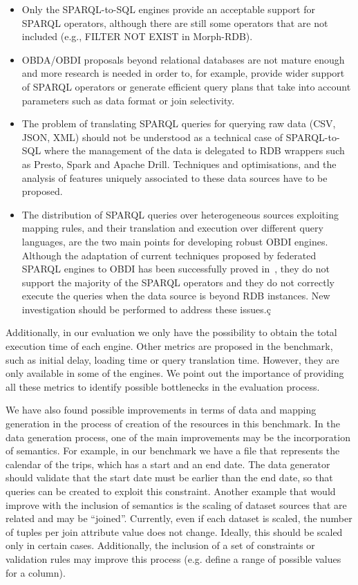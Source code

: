 \begin{itemize}
    \item Only the SPARQL-to-SQL engines provide an acceptable support for SPARQL operators, although there are still some operators that are not included (e.g., FILTER NOT EXIST in Morph-RDB).
    \item OBDA/OBDI proposals beyond relational databases are not mature enough and more research is needed in order to, for example, provide wider support of SPARQL operators or generate efficient query plans that take into account parameters such as data format or join selectivity.
    \item The problem of translating SPARQL queries for querying raw data (CSV, JSON, XML) should not be understood as a technical case of SPARQL-to-SQL where the management of the data is delegated to RDB wrappers such as Presto, Spark and Apache Drill. Techniques and optimisations, and the analysis of features uniquely associated to these data sources have to be proposed.
    \item The distribution of SPARQL queries over heterogeneous sources exploiting mapping rules, and their translation and execution over different query languages, are the two main points for developing robust OBDI engines. Although the adaptation of current techniques proposed by federated SPARQL engines to OBDI has been successfully proved in~\citep{endris2019ontario,mami2019querying}, they do not support the majority of the SPARQL operators and they do not correctly execute the queries when the data source is beyond RDB instances. New investigation should be performed to address these issues.ç
\end{itemize}


Additionally, in our evaluation we only have the possibility to obtain the total execution time of each engine. Other metrics are proposed in the benchmark, such as initial delay, loading time or query translation time. However, they are only available in some of the engines. We point out the importance of providing all these metrics to identify possible bottlenecks in the evaluation process.

We have also found possible improvements in terms of data and mapping generation in the process of creation of the resources in this benchmark. In the data generation process, one of the main improvements may be the incorporation of semantics. For example, in our benchmark we have a file that represents the calendar of the trips, which has a start and an end date. The data generator should validate that the start date must be earlier than the end date, so that queries can be created to exploit this constraint. Another example that would improve with the inclusion of semantics is the scaling of dataset sources that are related and may be ``joined''. Currently, even if each dataset is scaled, the number of tuples per join attribute value does not change. Ideally, this should be scaled only in certain cases. Additionally, the inclusion of a set of constraints or validation rules may improve this process (e.g. define a range of possible values for a column).

